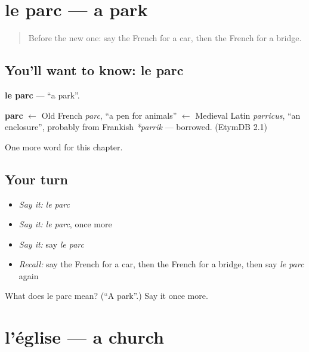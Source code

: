 \section[le parc]{le parc — a park}

\label{lesson:FR-C100-parc}



\begin{quote}
Before the new one: say the French for a car, then the French for a bridge.
\end{quote}

\subsection*{You'll want to know: le parc}
\textbf{le parc} — \textquotedblleft{}a park\textquotedblright{}.

\begin{cousinweb}
\textbf{parc} $\leftarrow$ Old French \emph{parc}, \textquotedblleft{}a pen for animals\textquotedblright{} $\leftarrow$ Medieval Latin \emph{parricus}, \textquotedblleft{}an enclosure\textquotedblright{}, probably from Frankish \emph{*parrik} — borrowed. (EtymDB 2.1)
\end{cousinweb}

\begin{grammarlens}[title={What you've built}]
One more word for this chapter.
\end{grammarlens}

\subsection*{Your turn}
\begin{itemize}
\raggedright
  \item \emph{Say it:} \emph{le parc}
  \item \emph{Say it:} \emph{le parc}, once more
  \item \emph{Say it:} say \emph{le parc}
  \item \emph{Recall:} say the French for a car, then the French for a bridge, then say \emph{le parc} again
\end{itemize}

\begin{tcolorbox}[breakable,colback=teal!4,colframe=teal!35!black,title={Before you move on}]
What does le parc mean? (\textquotedblleft{}A park\textquotedblright{}.) Say it once more.
\end{tcolorbox}
\section[l'église]{l'église — a church}

